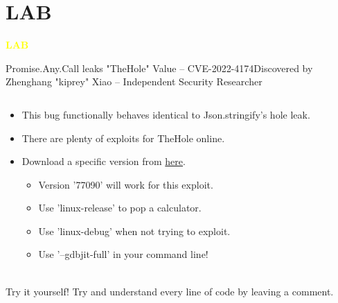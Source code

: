 \section{LAB}
\begin{frame}{}
    \centering
        \Huge\bfseries
    \textcolor{yellow}{LAB}
\end{frame}

\begin{frame}{Promise.Any.Call leaks "TheHole" Value -- CVE-2022-4174}{Discovered by Zhenghang "kiprey" Xiao -- Independent Security Researcher}
    \begin{columns}
        \begin{column}{0.55\textwidth}
            \begin{itemize}
                \item This bug functionally behaves identical to Json.stringify's hole leak.
                \item There are plenty of exploits for TheHole online. 
                \item Download a specific version from \href{https://commondatastorage.googleapis.com/v8-asan/index.html}{\color{pink}here}.
                    \begin{itemize}
                        \item Version '77090' will work for this exploit.
                        \item Use 'linux-release' to pop a calculator.
                        \item Use 'linux-debug' when not trying to exploit.
                        \item Use '--gdbjit-full' in your command line! 
                    \end{itemize}
            \end{itemize}
        \href{https://bugs.chromium.org/p/chromium/issues/detail?id=1379054}{\color{pink}{crbug-1379054}} \\
        Try it yourself! Try and understand every line of code by leaving a comment. 
        \end{column}
        \begin{column}{0.4\textwidth}
            \inputminted{js}{code/promise.tex}
        \end{column}
    \end{columns}
\end{frame}
